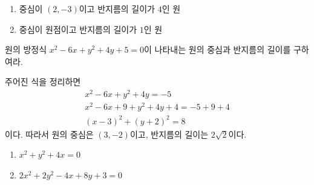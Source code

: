 \documentclass{oblivoir}
\begin{document}
%
\begin{enumerate}\label{circle3}%
\item
중심이 \((2,-3)\)이고 반지름의 길이가 \(4\)인 원 
\item
중심이 원점이고 반지름의 길이가 \(1\)인 원 
\end{enumerate}

%
\exam{}\label{circle4}
원의 방정식 \(x^2-6x+y^2+4y+5=0\)이 나타내는 원의 중심과 반지름의 길이를 구하여라.
\begin{mdframed}
주어진 식을 정리하면
\begin{gather*}
x^2-6x+y^2+4y=-5\\
x^2-6x+9+y^2+4y+4=-5+9+4\\
(x-3)^2+(y+2)^2=8
\end{gather*}
이다.
따라서 원의 중심은 \((3,-2)\)이고, 반지름의 길이는 \(2\sqrt2\)이다.
\end{mdframed}

%
\begin{enumerate}\label{circle5}%
\item
\(x^2+y^2+4x=0\)
\item
\(2x^2+2y^2-4x+8y+3=0\)
\end{enumerate}

\end{document}

